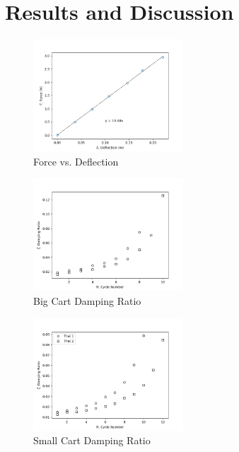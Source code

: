 \section{Results and Discussion}


\begin{figure}[H]
    \centering
    \includegraphics[width=0.5\textwidth]{matplotlib/force vs deflection.png}
    \caption{Force vs. Deflection}
    \label{fig:Force vs. Deflection}
\end{figure}
\begin{figure}[H]
    \centering
    \includegraphics[width=0.5\textwidth]{matplotlib/big cart damping ratio.png}
    \caption{Big Cart Damping Ratio}
    \label{fig:Big Cart Damping Ratio}
\end{figure}
\begin{figure}[H]
    \centering
    \includegraphics[width=0.5\textwidth]{matplotlib/small cart damping ratio.png}
    \caption{Small Cart Damping Ratio}
    \label{fig:Small Cart Damping Ratio}
\end{figure}
